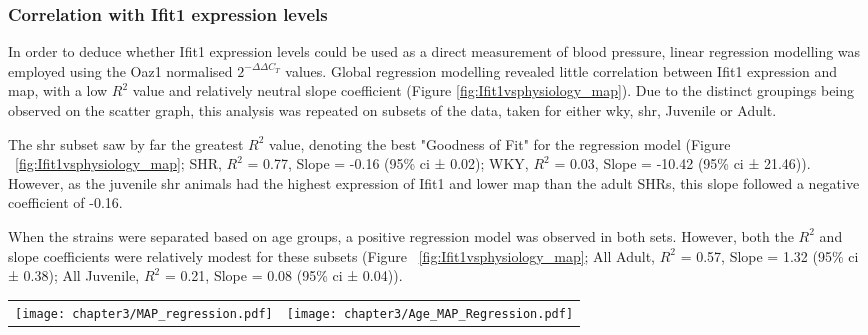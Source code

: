 \subsubsection{Correlation with Ifit1 expression levels}

In order to deduce whether Ifit1 expression levels could be used as a direct measurement of blood pressure, linear regression modelling was employed using the Oaz1 normalised $2^{-\Delta\Delta C_{T}}$ values. Global regression modelling revealed little correlation between Ifit1 expression and \acrshort{map}, with a low $R^{2}$ value and relatively neutral slope coefficient (Figure \ref{fig:Ifit1vsphysiology_map}). Due to the distinct groupings being observed on the scatter graph, this analysis was repeated on subsets of the data, taken for either \acrshort{wky}, \acrshort{shr}, Juvenile or Adult. 

The \acrshort{shr} subset saw by far the greatest $R^{2}$ value, denoting the best "Goodness of Fit" for the regression model (Figure ~\ref{fig:Ifit1vsphysiology_map}; SHR, $R^{2}$ = 0.77, Slope = -0.16 (95\% \acrshort{ci} ± 0.02); WKY, $R^{2}$ = 0.03, Slope = -10.42 (95\% \acrshort{ci} ± 21.46)). However, as the juvenile \acrshort{shr} animals had the highest expression of Ifit1 and lower \acrshort{map} than the adult SHRs, this slope followed a negative coefficient of -0.16.

When the strains were separated based on age groups, a positive regression model was observed in both sets. However, both the $R^{2}$ and slope coefficients were relatively modest for these subsets (Figure ~\ref{fig:Ifit1vsphysiology_map}; All Adult, $R^{2}$ = 0.57, Slope = 1.32 (95\% \acrshort{ci} ± 0.38); All Juvenile, $R^{2}$ = 0.21, Slope = 0.08 (95\% \acrshort{ci} ± 0.04)).

\begin{figure*}[!htbp]
\centering
\begin{tabular}{cc}
  \texttt{[image: chapter3/MAP\_regression.pdf]} & \texttt{[image: chapter3/Age\_MAP\_Regression.pdf]} \\
\end{tabular}
\caption[Linear Regression Analysis of Physiological \acrshort{map} against Ifit1 blood expression]{Linear Regression Analysis of Physiological \acrfull{map}, as \acrfull{mmhg}, against Oaz1 normalised Ifit1 blood expression $2^{-\Delta\Delta C_{T}}$ values. For the regression model, displayed here are the slope coefficient of the regression line and the $R^{2}$ correlation coefficient. Also highlighted in grey is the 95\% \acrfull{ci} range for the model. Note the rescaled x-axis for the \acrshort{wky} plot.}
\label{fig:Ifit1vsphysiology_map}
\end{figure*}

